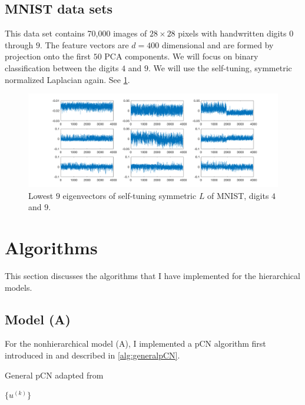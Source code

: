 \documentclass{siamart1116}
\begin{document}
    \subsection{MNIST data sets}
        This data set contains 70,000 images of $28 \times 28$ pixels with handwritten digits $0$ through $9$. The feature vectors are $d=400$ dimensional and are formed by projection onto the first $50$ PCA components. We will focus on binary classification between the digits $4$ and $9$. We will use the self-tuning, symmetric normalized Laplacian again. See \cref{fig:mnist_spec}.

        \begin{figure}[!htb]
        \caption{\label{fig:mnist_spec} Lowest $9$ eigenvectors of self-tuning symmetric $L$ of MNIST, digits $4$ and $9$.}
        \includegraphics[width=\linewidth]{laplacians/mnist_laplacian.png}
        \end{figure}

\section{Algorithms}
    This section discusses the algorithms that I have implemented for the hierarchical models.

    \subsection{Model (A)}
        For the nonhierarchical model (A), I implemented a pCN algorithm first introduced in \cite{BeRoStVo08} and described in \cref{alg:generalpCN}.

        \begin{algorithm}
        \caption{General pCN adapted from \cite{CoRoStWh13}}
        \label{alg:generalpCN}
        \begin{algorithmic}
        \EndFor
        \State \Return $\{u^{(k)}\}$
        \end{algorithmic}
        \end{algorithm}
\end{document}
